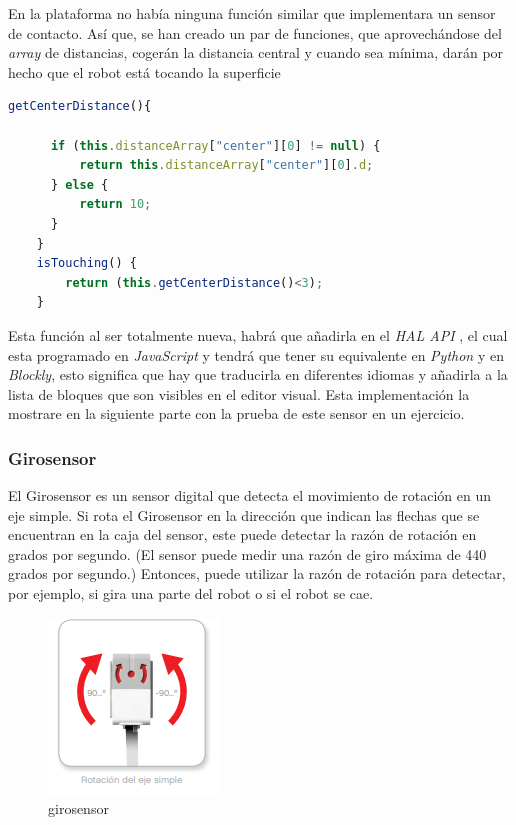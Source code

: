 En la plataforma no había ninguna función similar que implementara un sensor de contacto. Así que, se han creado un par de funciones, que aprovechándose del \textit{array} de distancias, cogerán la distancia central y cuando sea mínima, darán por hecho que el robot está tocando la superficie

   \begin{lstlisting}[language=javascript]
     getCenterDistance(){
      
      if (this.distanceArray["center"][0] != null) {
          return this.distanceArray["center"][0].d;
      } else {
          return 10;
      }
    }
    isTouching() {
        return (this.getCenterDistance()<3);
    }
\end{lstlisting}

Esta función al ser totalmente nueva, habrá que añadirla en el \textit{HAL API} , el cual esta programado en \textit{JavaScript} y tendrá que tener su equivalente en \textit{Python} y en \textit{Blockly}, esto significa que hay que traducirla en diferentes idiomas y añadirla a la lista de bloques que son visibles en el editor visual. Esta implementación la mostrare en la siguiente parte con la prueba de este sensor en un ejercicio.

\subsubsection{Girosensor}
El Girosensor es un sensor digital que detecta el movimiento de rotación en un eje simple. Si rota el Girosensor en la dirección que indican las flechas que se encuentran en la caja del sensor, este puede detectar la razón de rotación en grados por segundo. (El sensor puede medir una razón de giro máxima de 440 grados por segundo.) Entonces, puede utilizar la razón de rotación para detectar, por ejemplo, si gira una parte del robot o si el robot se cae.

\begin{figure}
    \centering
    \includegraphics[width=0.5\linewidth]{img/gyrosensor.png}
    \caption{girosensor}
    \label{fig:girosensor}
\end{figure}


